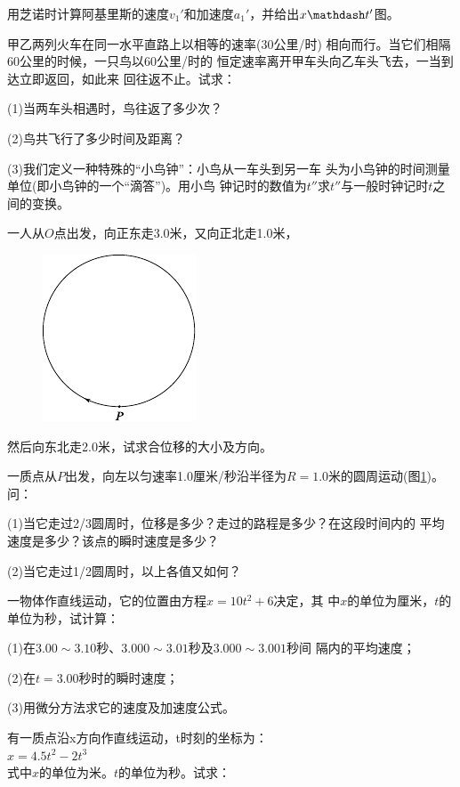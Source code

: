 \begin{exercises}

\exercise 用芝诺时计算阿基里斯的速度$v_1'$和加速度$a_1'$，并给出$x \mathdash t'$图。

\exercise 甲乙两列火车在同一水平直路上以相等的速率(30公里/时)
相向而行。当它们相隔60公里的时候，一只鸟以60公里/时的
恒定速率离开甲车头向乙车头飞去，一当到达立即返回，如此来
回往返不止。试求：

(1)当两车头相遇时，鸟往返了多少次？

(2)鸟共飞行了多少时间及距离？

(3)我们定义一种特殊的“小鸟钟”：小鸟从一车头到另一车
头为小鸟钟的时间测量单位(即小鸟钟的一个“滴答”)。用小鸟
钟记时的数值为$t''$求$t''$与一般时钟记时$t$之间的变换。

\exercise 一人从$O$点出发，向正东走3.0米，又向正北走1.0米，
\begin{figure}
  \begin{center}
    \includegraphics{figure/fig01.28}
    \caption{}
    \label{fig:01.28}
  \end{center}
\end{figure}
然后向东北走2.0米，试求合位移的大小及方向。

\exercise 一质点从$ P $出发，向左以匀速率1.0厘米/秒沿半径为$R=1.0$米的圆周运动(图\ref{fig:01.28})。问：

(1)当它走过2/3圆周时，位移是多少？走过的路程是多少？在这段时间内的
平均速度是多少？该点的瞬时速度是多少？

\clearpage
(2)当它走过1/2圆周时，以上各值又如何？

\exercise 一物体作直线运动，它的位置由方程$x=10t^2+6$决定，其
中$x$的单位为厘米，$t$的单位为秒，试计算：

(1)在$ 3.00\sim 3.10 $秒、$ 3.000\sim 3.01 $秒及$ 3.000\sim 3.001 $秒间
隔内的平均速度；

(2)在$t=3.00$秒时的瞬时速度；

(3)用微分方法求它的速度及加速度公式。

\exercise 有一质点沿x方向作直线运动，t时刻的坐标为：\\
\null\qquad\qquad \qquad $x=4.5t^2-2t^3$\\
式中$x$的单位为米。$t$的单位为秒。试求：


\end{exercises}

